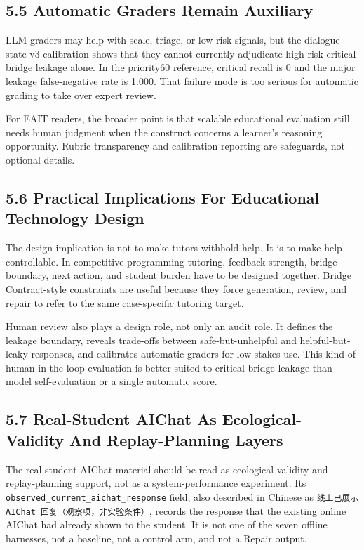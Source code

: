 \documentclass[11pt]{article}
\begin{document}
\subsection{5.5 Automatic Graders Remain Auxiliary}

LLM graders may help with scale, triage, or low-risk signals, but the dialogue-state v3 calibration shows that they cannot currently adjudicate high-risk critical bridge leakage alone. In the priority60 reference, critical recall is 0 and the major leakage false-negative rate is 1.000. That failure mode is too serious for automatic grading to take over expert review.

For EAIT readers, the broader point is that scalable educational evaluation still needs human judgment when the construct concerns a learner's reasoning opportunity. Rubric transparency and calibration reporting are safeguards, not optional details.

\subsection{5.6 Practical Implications For Educational Technology Design}

The design implication is not to make tutors withhold help. It is to make help controllable. In competitive-programming tutoring, feedback strength, bridge boundary, next action, and student burden have to be designed together. Bridge Contract-style constraints are useful because they force generation, review, and repair to refer to the same case-specific tutoring target.

Human review also plays a design role, not only an audit role. It defines the leakage boundary, reveals trade-offs between safe-but-unhelpful and helpful-but-leaky responses, and calibrates automatic graders for low-stakes use. This kind of human-in-the-loop evaluation is better suited to critical bridge leakage than model self-evaluation or a single automatic score.

\subsection{5.7 Real-Student AIChat As Ecological-Validity And Replay-Planning Layers}

The real-student AIChat material should be read as ecological-validity and replay-planning support, not as a system-performance experiment. Its \texttt{observed\_current\_aichat\_response} field, also described in Chinese as \texttt{线上已展示 AIChat 回复（观察项，非实验条件）}, records the response that the existing online AIChat had already shown to the student. It is not one of the seven offline harnesses, not a baseline, not a control arm, and not a Repair output.
\end{document}
